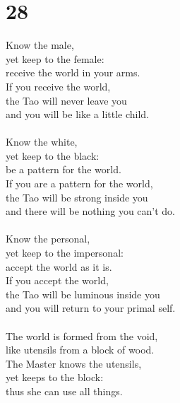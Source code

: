 \documentclass[b5paper, 12pt, oneside]{book}
\begin{document}
\chapter*{28}
Know the male,\\
yet keep to the female:\\
receive the world in your arms.\\
If you receive the world,\\
the Tao will never leave you\\
and you will be like a little child.\\
\\
Know the white,\\
yet keep to the black:\\
be a pattern for the world.\\
If you are a pattern for the world,\\
the Tao will be strong inside you\\
and there will be nothing you can't do.\\
\\
Know the personal,\\
yet keep to the impersonal:\\
accept the world as it is.\\
If you accept the world,\\
the Tao will be luminous inside you\\
and you will return to your primal self.\\
\\
The world is formed from the void,\\
like utensils from a block of wood.\\
The Master knows the utensils,\\
yet keeps to the block:\\
thus she can use all things.\\
\end{document}
